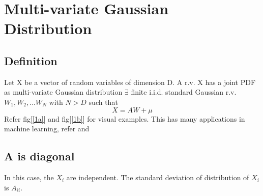 \documentclass{article}
\begin{document}
\section{Multi-variate Gaussian Distribution}
\subsection{Definition}
Let X be a vector of random variables of dimension D.
A r.v. X has a joint PDF as multi-variate Gaussian distribution $\exists$ finite i.i.d. standard Gaussian
 r.v. $W_{1},W_{2},...W_{N}$ with $N > D$ such that
 \[X = AW + \mu\]
Refer fig[\ref{1a}] and fig[\ref{1b}] for visual examples. This has many applications in machine learning, refer \cite{rasmussen} and \cite{distill}
\subsection{A is diagonal}
In this case, the $X_{i}$ are independent. The standard deviation of distribution of $X_{i}$ is $A_{ii}$.
\end{document}

